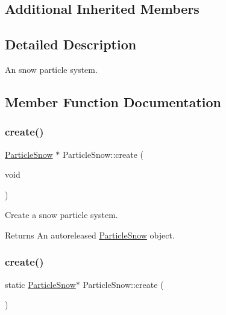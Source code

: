 \subsection*{Additional Inherited Members}


\subsection{Detailed Description}
An snow particle system. 

\subsection{Member Function Documentation}
\mbox{\label{classParticleSnow_a5068271adb89ac4930eae345afade3a0}} 
\subsubsection{\texorpdfstring{create()}{create()}\hspace{0.1cm}{\footnotesize\ttfamily [1/2]}}
{\footnotesize\ttfamily \hyperlink{classParticleSnow}{Particle\+Snow} $\ast$ Particle\+Snow\+::create (\begin{DoxyParamCaption}\item[{void}]{ }\end{DoxyParamCaption})\hspace{0.3cm}{\ttfamily [static]}}

Create a snow particle system.

\begin{DoxyReturn}{Returns}
An autoreleased \hyperlink{classParticleSnow}{Particle\+Snow} object. 
\end{DoxyReturn}
\mbox{\label{classParticleSnow_ae546c0f065ff090d275923d24ed7cf19}} 
\subsubsection{\texorpdfstring{create()}{create()}\hspace{0.1cm}{\footnotesize\ttfamily [2/2]}}
{\footnotesize\ttfamily static \hyperlink{classParticleSnow}{Particle\+Snow}$\ast$ Particle\+Snow\+::create (\begin{DoxyParamCaption}{ }\end{DoxyParamCaption})\hspace{0.3cm}{\ttfamily [static]}}

